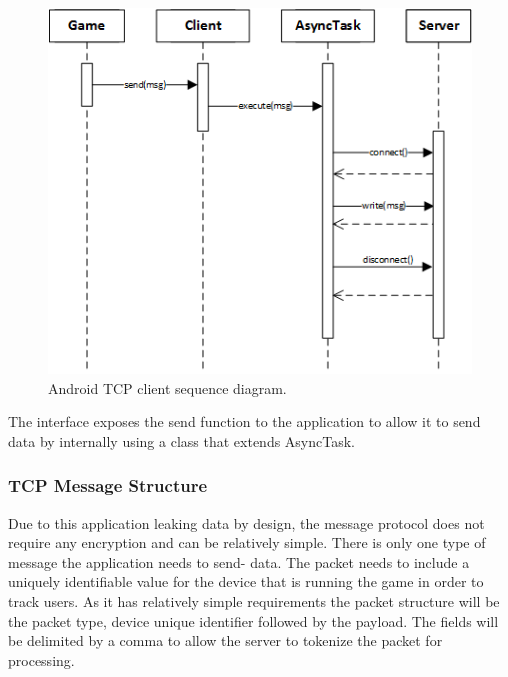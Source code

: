 \begin{figure}[h!]
\centering\includegraphics[width=\linewidth]{design/figures/tcp-client-sd.png}
\caption{Android TCP client sequence diagram.}
\end{figure}

The interface exposes the send function to the application to allow it to send data by internally using a class that extends AsyncTask.

\subsubsection{TCP Message Structure}
\label{design:tcp-structure}
Due to this application leaking data by design, the message protocol does not require any encryption and can be relatively simple. There is only one type of message the application needs to send- data. The packet needs to include a uniquely identifiable value for the device that is running the game in order to track users. As it has relatively simple requirements the packet structure will be the packet type, device unique identifier followed by the payload. The fields will be delimited by a comma to allow the server to tokenize the packet for processing.
\clearpage